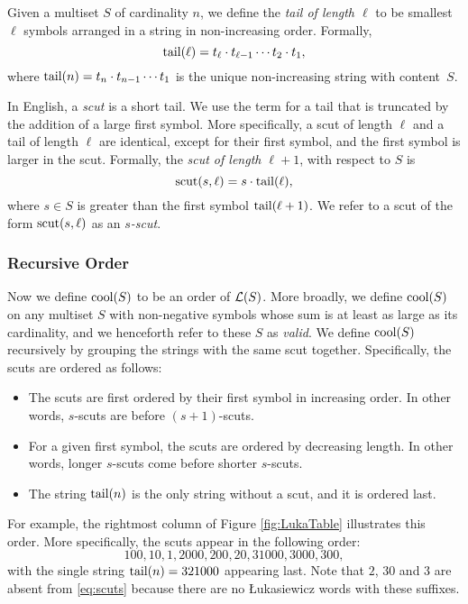 Given a multiset $S$ of cardinality $n$, we define the \emph{tail of length $\ell$} to be smallest $\ell$ symbols arranged in a string in non-increasing order.
Formally,
\begin{equation}
    \operatorname{tail}(\ell) = t_{\ell} \cdot t_{\ell-1} \cdots t_2 \cdot t_1,
\end{equation}
where $\operatorname{tail}(n) = t_n \cdot t_{n-1} \cdots t_1$ is the unique non-increasing string with content~$S$.

In English, a \emph{scut} is a short tail.
We use the term for a tail that is truncated by the addition of a large first symbol.
More specifically, a scut of length $\ell$ and a tail of length $\ell$ are identical, except for their first symbol, and the first symbol is larger in the scut. %
Formally, the \emph{scut of length $\ell+1$}, with respect to $S$ is
\begin{equation}
    \operatorname{scut}(s, \ell) = s \cdot \operatorname{tail}(\ell),
\end{equation}
where $s \in S$ is greater than the first symbol $\operatorname{tail}(\ell+1)$.
We refer to a scut of the form $\operatorname{scut}(s, \ell)$ as an \emph{$s$-scut}.

\subsubsection{Recursive Order}
\label{sec:proof_recursive}

Now we define $\operatorname{cool}(S)$ to be an order of $\mathcal{L}(S)$.
More broadly, we define $\operatorname{cool}(S)$ on any multiset $S$ with non-negative symbols whose sum is at least as large as its cardinality, and we henceforth refer to these $S$ as \emph{valid}.
We define $\operatorname{cool}(S)$ recursively by grouping the strings with the same scut together.
Specifically, the scuts are ordered as follows:
\begin{itemize}
    \item The scuts are first ordered by their first symbol in increasing order.
    In other words, $s$-scuts are before $(s+1)$-scuts.
    \item For a given first symbol, the scuts are ordered by decreasing length.
    In other words, longer $s$-scuts come before shorter $s$-scuts.
    \item The string $\operatorname{tail}(n)$ is the only string without a scut, and it is ordered last.
\end{itemize}
For example, the rightmost column of Figure \ref{fig:LukaTable} illustrates this order.
More specifically, the scuts appear in the following order:
\begin{equation} \label{eq:scuts}
100, 10, 1, 2000, 200, 20, 31000, 3000, 300,    
\end{equation}
with the single string $\operatorname{tail}(n) = 321000$ appearing last.
Note that $2$, $30$ and $3$ are absent from \eqref{eq:scuts} because there are no Łukasiewicz words with these suffixes.

